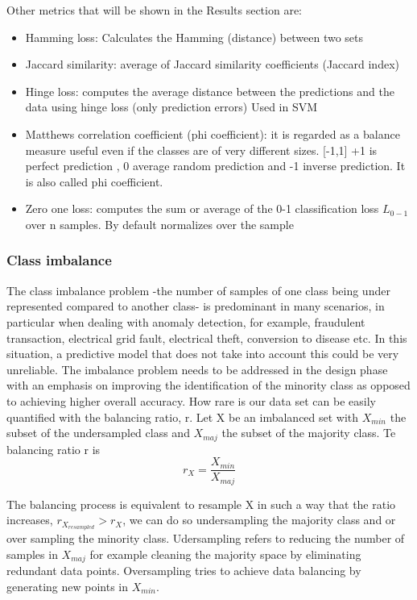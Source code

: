 \documentclass[12pt]{report}
\begin{document}
Other metrics that will be shown in the Results section are:
\begin{itemize}
	\item Hamming loss: Calculates the Hamming (distance) between two sets
	\item Jaccard similarity: average of Jaccard similarity coefficients (Jaccard index)
	\item Hinge loss: computes the average distance between the predictions and the data using hinge loss (only prediction errors) Used in SVM
	\item Matthews correlation coefficient (phi coefficient): it is regarded as a balance measure useful even if the classes are of very different sizes. [-1,1] +1 is perfect prediction , 0 average random prediction and -1 inverse prediction. It is also called phi coefficient.
	\item Zero one loss: computes the sum or average of the 0-1 classification loss $L_{0-1}$ over n samples. By default normalizes over the sample
\end{itemize}

\subsubsection{Class imbalance}
The class imbalance problem -the number of samples of one class being under represented compared to another class- is predominant in many scenarios, in particular when dealing with anomaly detection, for example, fraudulent transaction, electrical grid fault, electrical theft, conversion to disease  etc. In this situation, a predictive model that does not take into account this could be very unreliable.
The imbalance problem needs to be addressed in the design phase with an emphasis on improving the identification of the minority class as opposed to achieving higher overall accuracy.
How rare is our data set can be easily quantified with the balancing ratio, r. Let X be an imbalanced set with $X_{min}$ the subset of the undersampled class and $X_{maj}$ the subset of the majority class. Te balancing ratio r is
\begin{equation}
r_X = \frac{X_{min}}{X_{maj}}
\end{equation}

The balancing process is equivalent to resample X in such a way that the ratio increases, $r_{X_{resampled}} > r_X$, we can do so undersampling the majority class and or over sampling the minority class. Udersampling refers to reducing the number of samples in $X_{maj}$ for example cleaning the majority space by eliminating redundant data points. Oversampling tries to achieve data balancing by generating new points in $X_{min}$.
\end{document}
